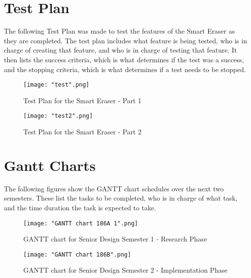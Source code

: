 \section{Test Plan}

The following Test Plan was made to test the features of the Smart Eraser as they are completed. The test plan includes what feature is being tested, who is in charge of creating that feature, and who is in charge of testing that feature. It then lists the success criteria, which is what determines if the test was a success, and the stopping criteria, which is what determines if a test needs to be stopped.

\begin{figure}[H]
	\centering
	\texttt{[image: "test".png]}
	\caption{Test Plan for the Smart Eraser - Part 1}
	\label{fig:test}
\end{figure}

\begin{figure}[H]
	\centering
	\texttt{[image: "test2".png]}
	\caption{Test Plan for the Smart Eraser - Part 2}
	\label{fig:test2}
\end{figure}

\section{Gantt Charts}

The following figures show the GANTT chart schedules over the next two semesters. These list the tasks to be completed, who is in charge of what task, and the time duration the task is expected to take.

\begin{figure}[H]
	\centering
	\texttt{[image: "GANTT chart 186A 1".png]}
	\caption{GANTT chart for Senior Design Semester 1 - Research Phase}
	\label{fig:GANTT186A}
\end{figure}

\begin{figure}[H]
	\centering
	{\texttt{[image: "GANTT chart 186B".png]}}
	\caption{GANTT chart for Senior Design Semester 2 - Implementation Phase}
	\label{fig:GANTT186B}
\end{figure}

